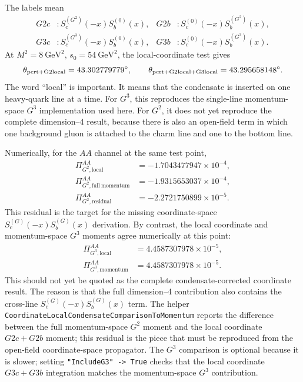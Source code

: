 \documentclass[11pt]{article}
\begin{document}
The labels mean
\begin{align}
  G2c &: S_c^{(G^2)}(-x)S_b^{(0)}(x),&
  G2b &: S_c^{(0)}(-x)S_b^{(G^2)}(x),\\
  G3c &: S_c^{(G^3)}(-x)S_b^{(0)}(x),&
  G3b &: S_c^{(0)}(-x)S_b^{(G^3)}(x).
\end{align}
At \(M^2=8~\mathrm{GeV}^2\), \(s_0=54~\mathrm{GeV}^2\), the local-coordinate
test gives
\begin{equation}
  \theta_{\rm pert+G2local}=43.302779779^\circ,\qquad
  \theta_{\rm pert+G2local+G3local}=43.295658148^\circ.
\end{equation}
The word ``local'' is important.  It means that the condensate is inserted on
one heavy-quark line at a time.  For \(G^3\), this reproduces the
single-line momentum-space \(G^3\) implementation used here.  For \(G^2\), it
does not yet reproduce the complete dimension--4 result, because there is also
an open-field term in which one background gluon is attached to the charm line
and one to the bottom line.

Numerically, for the \(AA\) channel at the same test point,
\begin{align}
  \Pi_{G^2,\mathrm{local}}^{AA}
  &=
  -1.7043477947\times10^{-4},\\
  \Pi_{G^2,\mathrm{full\ momentum}}^{AA}
  &=
  -1.9315653037\times10^{-4},\\
  \Pi_{G^2,\mathrm{residual}}^{AA}
  &=
  -2.2721750899\times10^{-5}.
\end{align}
This residual is the target for the missing coordinate-space
\(S_c^{(G)}(-x)S_b^{(G)}(x)\) derivation.  By contrast, the local coordinate
and momentum-space \(G^3\) moments agree numerically at this point:
\begin{align}
  \Pi_{G^3,\mathrm{local}}^{AA}
  &=
  4.4587307978\times10^{-5},\\
  \Pi_{G^3,\mathrm{momentum}}^{AA}
  &=
  4.4587307978\times10^{-5}.
\end{align}
This should not yet be quoted as the complete condensate-corrected coordinate
result.  The reason is that the full dimension--4 contribution also contains
the cross-line \(S_c^{(G)}(-x)S_b^{(G)}(x)\) term.  The helper
\texttt{CoordinateLocalCondensateComparisonToMomentum} reports the difference
between the full momentum-space \(G^2\) moment and the local coordinate
\(G2c+G2b\) moment; this residual is the piece that must be reproduced from
the open-field coordinate-space propagator.  The \(G^3\) comparison is
optional because it is slower; setting \texttt{"IncludeG3" -> True} checks
that the local coordinate \(G3c+G3b\) integration matches the momentum-space
\(G^3\) contribution.
\end{document}

